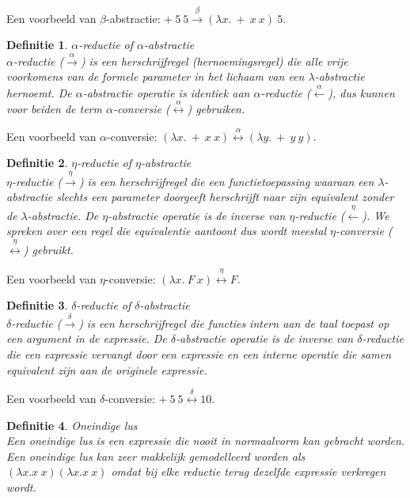 \documentclass[a4paper]{article}
\newtheorem{tdefinitie}{Definitie}[section]
\newenvironment{definitie}[1]%
  {\begin{mdframed}[backgroundcolor=silver,
    topline=false,
    rightline=false,
    leftline=false,
    bottomline=false]\begin{tdefinitie}#1\\\normalfont}%
  {\end{tdefinitie}\end{mdframed}}
\begin{document}
Een voorbeeld van $\beta$-abstractie: $+\ 5\ 5 \stackrel{\beta}{\longrightarrow} (\lambda x.\ +\ x\ x)\ 5$.

\begin{definitie}{$\alpha$-reductie of $\alpha$-abstractie}
  $\alpha$-reductie ($\stackrel{\alpha}{\longrightarrow}$) is een herschrijfregel (hernoemingsregel) die alle vrije voorkomens van de formele parameter in het lichaam van een $\lambda$-abstractie hernoemt. De $\alpha$-abstractie operatie is identiek aan $\alpha$-reductie ($\stackrel{\alpha}{\longleftarrow}$), dus kunnen voor beiden de term $\alpha$-conversie ($\stackrel{\alpha}{\longleftrightarrow}$) gebruiken.
\end{definitie}

Een voorbeeld van $\alpha$-conversie: $(\lambda x.\ +\ x\ x) \stackrel{\alpha}{\longleftrightarrow} (\lambda y.\ +\ y\ y)$.

\begin{definitie}{$\eta$-reductie of $\eta$-abstractie}
  $\eta$-reductie ($\stackrel{\eta}{\longrightarrow}$) is een herschrijfregel die een functietoepassing waaraan een $\lambda$-abstractie slechts een parameter doorgeeft herschrijft naar zijn equivalent zonder de $\lambda$-abstractie. De $\eta$-abstractie operatie is de inverse van $\eta$-reductie ($\stackrel{\eta}{\longleftarrow}$). We spreken over een regel die equivalentie aantoont dus wordt meestal $\eta$-conversie ($\stackrel{\eta}{\longleftrightarrow}$) gebruikt.
\end{definitie}

Een voorbeeld van $\eta$-conversie: $(\lambda x.\ F\ x) \stackrel{\eta}{\longleftrightarrow} F$.


\begin{definitie}{$\delta$-reductie of $\delta$-abstractie}
  $\delta$-reductie ($\stackrel{\delta}{\longrightarrow}$) is een herschrijfregel die functies intern aan de taal toepast op een argument in de expressie. De $\delta$-abstractie operatie is de inverse van $\delta$-reductie die een expressie vervangt door een expressie en een interne operatie die samen equivalent zijn aan de originele expressie.
\end{definitie}

Een voorbeeld van $\delta$-conversie: $+\ 5\ 5 \stackrel{\delta}{\longleftrightarrow} 10$.


\begin{definitie}{Oneindige lus}
  Een oneindige lus is een expressie die nooit in normaalvorm kan gebracht worden. Een oneindige lus kan zeer makkelijk gemodelleerd worden als $(\lambda x. x\ x)(\lambda x. x\ x)$ omdat bij elke reductie terug dezelfde expressie verkregen wordt.
\end{definitie}
\end{document}
